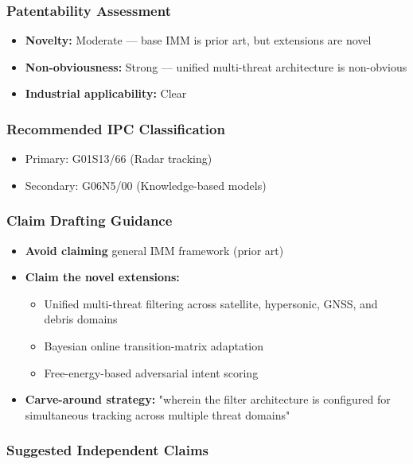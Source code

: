 \documentclass[11pt,a4paper]{article}
\begin{document}
\subsubsection*{Patentability Assessment}
\begin{itemize}
\item \textbf{Novelty:} Moderate — base IMM is prior art, but extensions are novel
\item \textbf{Non-obviousness:} Strong — unified multi-threat architecture is non-obvious
\item \textbf{Industrial applicability:} Clear
\end{itemize}

\subsubsection*{Recommended IPC Classification}
\begin{itemize}
\item Primary: G01S13/66 (Radar tracking)
\item Secondary: G06N5/00 (Knowledge-based models)
\end{itemize}

\subsubsection*{Claim Drafting Guidance}
\begin{itemize}
\item \textbf{Avoid claiming} general IMM framework (prior art)
\item \textbf{Claim the novel extensions:}
  \begin{itemize}
  \item Unified multi-threat filtering across satellite, hypersonic, GNSS, and debris domains
  \item Bayesian online transition-matrix adaptation
  \item Free-energy-based adversarial intent scoring
  \end{itemize}
\item \textbf{Carve-around strategy:} "wherein the filter architecture is configured for simultaneous tracking across multiple threat domains"
\end{itemize}

\subsubsection*{Suggested Independent Claims}
\end{document}
